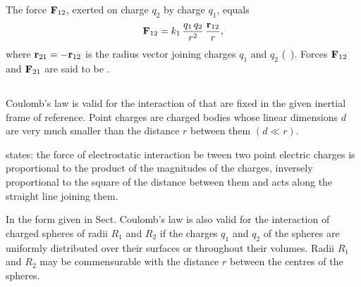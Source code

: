 The force $\vb{F}_{12}$, exerted on charge $q_{2}$ by charge $q_{1}$, equals
\begin{equation*}%
\vb{F}_{12} = k_{1} \,\frac{q_{1}\,q_{2}}{r^{2}} \, \frac{\vb{r}_{12}}{r},
\end{equation*}
where $\vb{r}_{21} = - \vb{r}_{12}$ is the radius vector joining charges $q_{1}$ and $q_{2}$ (~). Forces $\vb{F}_{12}$ and $\vb{F}_{21}$ are said to be . 

\subsection{}\label{14.2.3} Coulomb's law is valid for the interaction of  that are fixed in the given inertial frame of reference. Point charges are charged bodies whose linear dimensions $d$ are very much smaller than the distance $r$ between them $(d \ll r)$.

 states: the force of electrostatic interaction be­ tween two point electric charges is proportional to the product of the magnitudes of the charges, inversely proportional to the square of the distance between them and acts along the straight line joining them.

In the form given in Sect.  Coulomb's law is also valid
for the interaction of charged spheres of radii $R_{1}$ and $R_{2}$ if the charges $q_{1}$ and $q_{2}$ of the spheres are uniformly distributed over their surfaces or throughout their volumes. Radii $R_{1}$ and $R_{2}$ may be commensurable with the distance $r$ between the centres of the spheres.

